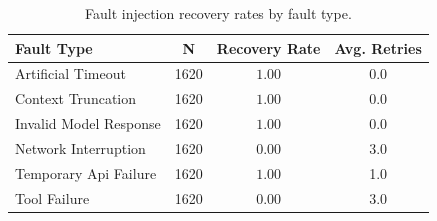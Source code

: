 \begin{table}[t]
\centering
\caption{Fault injection recovery rates by fault type.}
\label{tab:faults}
\begin{tabular}{lccc}
\toprule
Fault Type & N & Recovery Rate & Avg. Retries \\
\midrule
Artificial Timeout & 1620 & $1.00$ & 0.0 \\
Context Truncation & 1620 & $1.00$ & 0.0 \\
Invalid Model Response & 1620 & $1.00$ & 0.0 \\
Network Interruption & 1620 & $0.00$ & 3.0 \\
Temporary Api Failure & 1620 & $1.00$ & 1.0 \\
Tool Failure & 1620 & $0.00$ & 3.0 \\
\bottomrule
\end{tabular}
\end{table}
